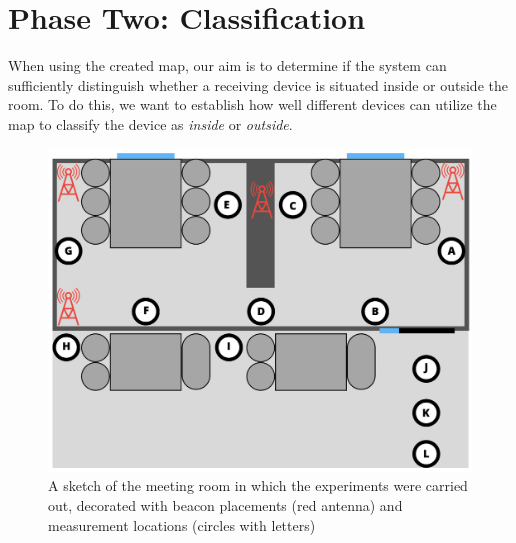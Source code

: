 \section{Phase Two: Classification}\label{sec:eval_phase2} %
When using the created map, our aim is to determine if the system can sufficiently distinguish whether a receiving device is situated inside or outside the room.
To do this, we want to establish how well different devices can utilize the map to classify the device as \textit{inside} or \textit{outside}. 
\begin{figure}[h]
    \centering
    \includegraphics[scale=0.5]{images/experiment_setup.png}
    \caption{A sketch of the meeting room in which the experiments were carried out, decorated with beacon placements (red antenna) and measurement locations (circles with letters)}
    \label{fig:experiment_setup}
\end{figure}

